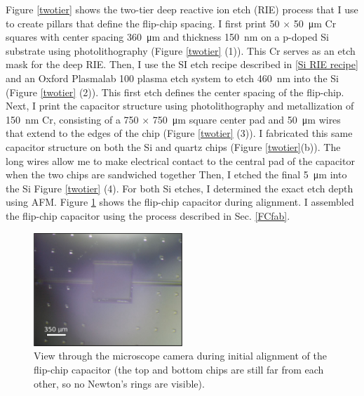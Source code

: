 \documentclass[double,12pt,1in]{beavtex}
\begin{document}
Figure \ref{twotier} shows the two-tier deep reactive ion etch (RIE) process that I use to create pillars that define the flip-chip spacing. I first print 50 $\times$ \SI{50}{\micro\meter} Cr squares with center spacing \SI{360}{\micro\meter} and thickness \SI{150}{\nano\meter} on a p-doped Si substrate using photolithography (Figure \ref{twotier} (1)). This Cr serves as an etch mask for the deep RIE. Then, I use the SI etch recipe described in \ref{Si RIE recipe} and an Oxford Plasmalab 100 plasma etch system to etch \SI{460}{\nano\meter} into the Si (Figure \ref{twotier} (2)). This first etch defines the center spacing of the flip-chip. Next, I print the capacitor structure using photolithography and metallization of \SI{150}{\nano\meter} Cr, consisting of a 750 $\times$ \SI{750}{\micro\meter} square center pad and \SI{50}{\micro\meter} wires that extend to the edges of the chip (Figure \ref{twotier} (3)). I fabricated this same capacitor structure on both the Si and quartz chips (Figure \ref{twotier}(b)). The long wires allow me to make electrical contact to the central pad of the capacitor when the two chips are sandwiched together Then, I etched the final \SI{5}{\micro\meter} into the Si Figure \ref{twotier} (4). For both Si etches, I determined the exact etch depth using AFM. Figure \ref{FCcap during alignment} shows the flip-chip capacitor during alignment. I assembled the flip-chip capacitor using the process described in Sec. \ref{FCfab}. 
 

\begin{figure}
    \includegraphics[width = 0.5\textwidth]{FCCap during alignment.pdf}
    \caption{View through the microscope camera during initial alignment of the flip-chip capacitor (the top and bottom chips are still far from each other, so no Newton's rings are visible).}
    \label{FCcap during alignment}
\end{figure}
\end{document}
